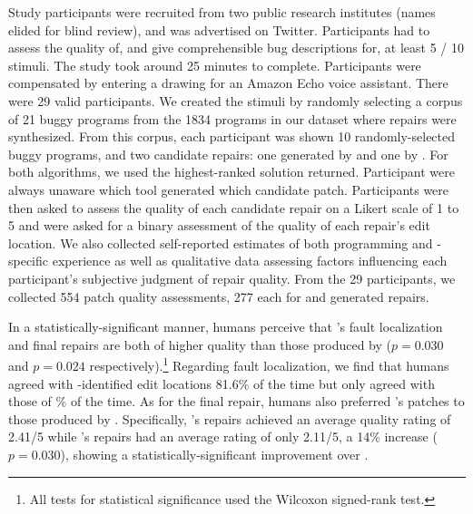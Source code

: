 %
Study participants were recruited from two public research
institutes (names elided for blind review), and was advertised on Twitter.
%
Participants had to assess the quality of, and give comprehensible
bug descriptions for, at least 5 / 10 stimuli. The study took around
25 minutes to complete. Participants were compensated by entering a
drawing for an Amazon Echo voice assistant. There were 29 valid participants.
%
We created the stimuli by randomly selecting a corpus of 21 buggy programs
from the 1834 programs in our dataset where repairs were synthesized.
%
From this corpus, each participant was shown 10 randomly-selected buggy
programs, and two candidate repairs: one generated by \toolname and one
by \seminal.
%
For both algorithms, we used the highest-ranked solution returned.
%
Participant were always unaware which tool generated which candidate
patch.
%
Participants were then asked to assess the quality of each
candidate repair on a Likert scale of 1 to 5 and were asked
for a binary assessment of the quality of each repair's edit
location.
%
We also collected self-reported estimates of both programming and
\ocaml-specific experience as well as qualitative data assessing factors
influencing each participant's subjective judgment of repair quality.
%
From the 29 participants, we collected 554 patch quality assessments,
277 each for \toolname and \seminal generated repairs.


%
In a statistically-significant manner, humans perceive that
\toolname's fault localization and final repairs are both
of higher quality than those produced by \seminal ($p=0.030$
and $p=0.024$ respectively).\footnote{All tests for statistical
significance used the Wilcoxon signed-rank test.}
%
Regarding fault localization, we find that humans agreed
with \toolname-identified edit locations 81.6\% of the time
but only agreed with those of \% of the time.
%
%
As for the final repair, humans also preferred \toolname's patches
to those produced by \seminal. Specifically, \toolname's repairs
achieved an average quality rating of 2.41/5 while \seminal's
repairs had an average rating of only 2.11/5, a 14\% increase ($p=0.030$),
showing a statistically-significant improvement over \seminal.

